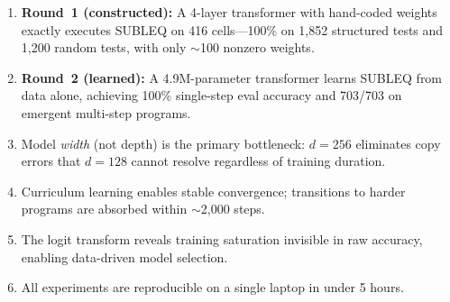 \documentclass[11pt,a4paper]{article}
\begin{document}
\begin{finding}
\begin{enumerate}[nosep,leftmargin=1.2em]
  \item \textbf{Round~1 (constructed):} A 4-layer transformer with hand-coded weights exactly executes SUBLEQ on 416 cells---100\% on 1{,}852 structured tests and 1{,}200 random tests, with only $\sim$100 nonzero weights.
  \item \textbf{Round~2 (learned):} A 4.9M-parameter transformer learns SUBLEQ from data alone, achieving 100\% single-step eval accuracy and 703/703 on emergent multi-step programs.
  \item Model \emph{width} (not depth) is the primary bottleneck: $d{=}256$ eliminates copy errors that $d{=}128$ cannot resolve regardless of training duration.
  \item Curriculum learning enables stable convergence; transitions to harder programs are absorbed within $\sim$2{,}000 steps.
  \item The logit transform reveals training saturation invisible in raw accuracy, enabling data-driven model selection.
  \item All experiments are reproducible on a single laptop in under 5 hours.
\end{enumerate}
\end{finding}
\end{document}
